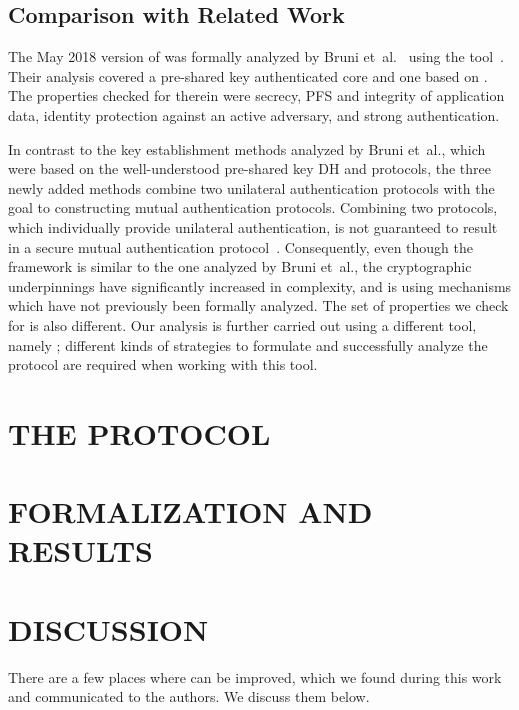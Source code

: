 \documentclass[a4paper,twoside]{article}
\begin{document}
\subsection{Comparison with Related Work}
The May 2018 version of \mEdhoc{} was formally analyzed by
Bruni et~al.~\cite{DBLP:conf/secsr/BruniJPS18} using the \mProverif{}
tool~\cite{DBLP:conf/csfw/Blanchet01}.
%
Their analysis covered a pre-shared key authenticated core and one
based on \mSigma.
%
The properties checked for therein were secrecy, PFS and integrity of
application data, identity protection against an active adversary,
and strong authentication.
%

In contrast to the key establishment methods analyzed by Bruni et~al., which
were based on the well-understood pre-shared key DH and \mSigma{} protocols,
the three newly added
methods combine two unilateral authentication protocols with the goal to
constructing mutual authentication protocols.
%
Combining two protocols, which individually provide unilateral authentication,
is not guaranteed to result in a secure mutual authentication
protocol~\cite{DBLP:conf/ccs/Krawczyk16}.
%
Consequently, even though the framework is similar to the one analyzed by Bruni
et~al., the cryptographic underpinnings have significantly increased in
complexity, and is using mechanisms which have not previously been formally analyzed.
%
The set of properties we check for is also different.
%
Our analysis is further carried out using a different tool,
namely \mTamarin; different kinds of strategies to formulate and
successfully analyze the protocol are required when working with this tool.
%

\section{\uppercase{The \mEdhoc{} Protocol}}
\label{sec:edhoc}


\section{\uppercase{Formalization and Results}}
\label{sec:formalization}


\section{\uppercase{Discussion}}
\label{sec:discussion}
There are a few places where \mEdhoc{} can be improved,
which we found during this work and communicated to the authors.
%
We discuss them below.
%
\end{document}
